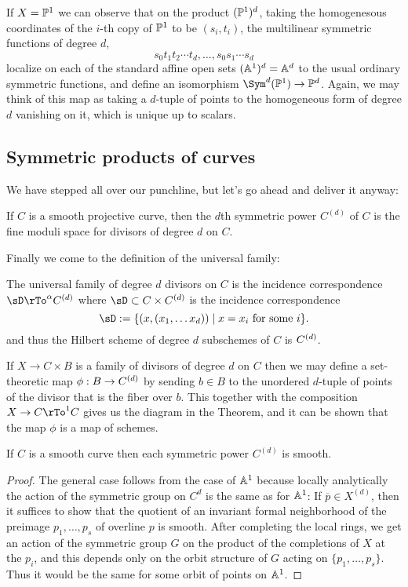 If $X = \PP^1$ we can observe that on the product $(\PP^1)^d$, taking the homogenesous coordinates of the
$i$-th copy of $\PP^1$ to be $(s_i,t_i)$, the multilinear symmetric functions of degree $d$,
$$
s_0t_1t_2\cdots t_d,\dots,s_0s_1\cdots s_d
$$
localize on each of the standard affine open sets $(\AA^1)^d=\AA^d$ to the usual ordinary symmetric functions, and define
an isomorphism $\Sym^d(\PP^1)\to \PP^d$.
Again, we may think of this map as taking a $d$-tuple of points to the
homogeneous form of degree $d$ vanishing on it, which is unique up to scalars.

\subsection{Symmetric products of curves}

We have stepped all over our punchline, but let's go ahead and deliver it anyway:
\begin{fact}
If $C$ is a smooth projective curve, then the $d$th symmetric power $C^{(d)}$ of $C$ is the fine moduli space for divisors of degree $d$ on $C$.
\end{fact}

Finally we come to the definition of the universal family:

\begin{fact}
 The universal family of degree $d$ divisors on $C$ is the incidence correspondence $\sD\rTo^\alpha \Cd$ where
 $\sD \subset C \times \Cd$ is the incidence correspondence 
$$
\sD := \{(x,(x_1,\dots x_d)) \mid x = x_i\hbox{ for some }i\}.
$$
and thus the Hilbert scheme of degree $d$ subschemes of $C$ is $\Cd$.

If $X \to C\times B$ is a family of divisors of degree $d$ on $C$ then we may define a set-theoretic map $\phi: B\to \Cd$ by sending $b\in B$ to the
unordered $d$-tuple of points of the divisor that is the fiber over $b$. This together with the composition $X \to C \rTo^1 C$
gives us the diagram in the Theorem, and it can be shown that the map $\phi$ is a map of schemes.
\end{fact}
 
\begin{proposition}
If $C$ is a smooth curve then each symmetric power $C^{(d)}$ is smooth.
\end{proposition}
\begin{proof}
 The general case follows from the case of $\AA^{1}$ because locally analytically the action of the symmetric group on $C^d$ is the same as for $\AA^1$: If  $\overline p \in X^{(d)}$, then it suffices to
 show that the quotient of an invariant formal neighborhood of the preimage $p_1,\dots, p_s$ of
 overline $p$ is smooth. After completing the local rings, we get an action of the symmetric group
 $G$ on the product of the completions of $X$ at the $p_i$, and this depends only on the orbit
 structure of $G$ acting on $\{p_1,\dots, p_s\}$. Thus it would be the same for some orbit of
 points on $\AA^1$.
 \end{proof}

